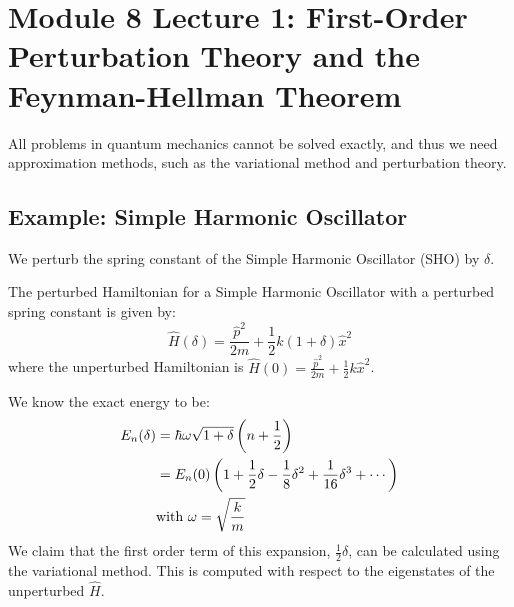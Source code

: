 % 


\section{Module 8 Lecture 1: First-Order Perturbation Theory and the
Feynman-Hellman Theorem}
All problems in quantum mechanics cannot be solved exactly, and thus
we need approximation methods, such as the variational method and
perturbation theory.

\subsection{Example: Simple Harmonic Oscillator}
We perturb the spring constant of the Simple Harmonic Oscillator
(SHO) by $\delta$.

\begin{definition}
    The perturbed Hamiltonian for a Simple Harmonic Oscillator with a
    perturbed spring constant is given by:
    \begin{equation} \label{eq:sho_perturbed_H}
        \hat H(\delta) = \frac{\hat p^2 }{2m} + \frac{1}{2}k(1+\delta)\hat x^2
    \end{equation}
    where the unperturbed Hamiltonian is $\hat H(0) = \frac{\hat p^2
    }{2m} + \frac{1}{2}k\hat x^2$.
\end{definition}

We know the exact energy to be:
\begin{align} \label{eq:sho_exact_energy_taylor}
    E_n(\delta) &= \hbar \omega \sqrt{1+\delta} \left(n+\frac{1}{2}\right) \\
    &= E_n(0)\left(1 + \frac{1}{2}\delta - \frac{1}{8}\delta^2 +
    \frac{1}{16}\delta^3 + \cdots\right) \notag \\
    &\text{with } \omega=\sqrt{\frac{k}{m}} \notag
\end{align}
We claim that the first order term of this expansion,
$\frac{1}{2}\delta$, can be calculated using the variational method.
This is computed with respect to the eigenstates of the unperturbed $\hat H$.

